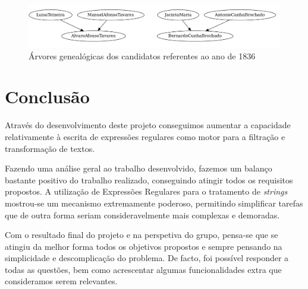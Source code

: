\documentclass[a4paper, 11pt]{article}
\begin{document}
\

\begin{figure}[H]
    \centering
    \includegraphics[width=\textwidth]{img/1836.png}
    \caption{Árvores genealógicas dos candidatos referentes ao ano de 1836}
\end{figure}

\pagebreak

\section{Conclusão}
\label{sec:conclusao}

Através do desenvolvimento deste projeto conseguimos aumentar a capacidade relativamente à escrita
de expressões regulares como motor para a filtração e transformação de textos. 

Fazendo uma análise geral ao trabalho desenvolvido, fazemos um balanço bastante positivo do trabalho
realizado, conseguindo atingir todos os requisitos propostos. A utilização de Expressões Regulares
para o tratamento de \textit{strings} mostrou-se um mecanismo extremamente poderoso, permitindo
simplificar tarefas que de outra forma seriam consideravelmente mais complexas e demoradas.

Com o resultado final do projeto e na perspetiva do grupo, pensa-se que se atingiu da melhor forma
todos os objetivos propostos e sempre pensando na simplicidade e descomplicação do problema. De facto,
foi possível responder a todas as questões, bem como acrescentar algumas funcionalidades extra que
consideramos serem relevantes. 
\end{document}

